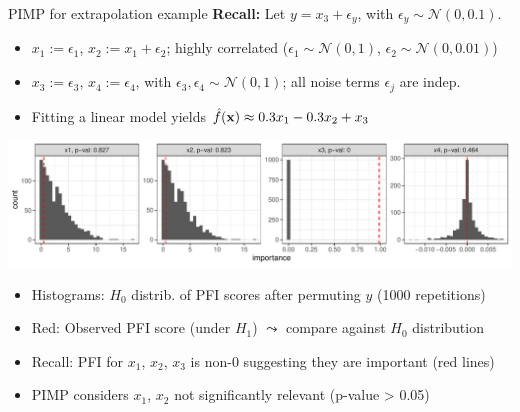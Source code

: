 \documentclass[10pt,compress,t,notes=noshow, xcolor=table]{beamer}
\begin{document}
\begin{frame}{PIMP for extrapolation example}
\textbf{Recall:} 
 Let $y = x_3 + \epsilon_y$, with $\epsilon_y \sim \mathcal{N}(0, 0.1)$.

\begin{itemize}
  \item $x_1 := \epsilon_1$, $x_2 := x_1 + \epsilon_2$; highly correlated  
        ($\epsilon_1 \sim \mathcal{N}(0,1)$, $\epsilon_2 \sim \mathcal{N}(0, 0.01)$)
  \item $x_3 := \epsilon_3$, $x_4 := \epsilon_4$, with $\epsilon_3, \epsilon_4 \sim \mathcal{N}(0,1)$; all noise terms $\epsilon_j$ are indep.
  \item Fitting a linear model yields $\hat{f}(\mathbf{x}) \approx 0.3 x_1 - 0.3 x_2 + x_3$
\end{itemize}

%
  \includegraphics[width=\linewidth]{figure_man/pimp.pdf}

\begin{itemize}
    \item Histograms: $H_0$ distrib. of PFI scores after permuting $y$ (1000 repetitions)
    \item Red: Observed PFI score (under $H_1$) $\leadsto$ compare against $H_0$ distribution
    \item Recall: PFI for $x_1$, $x_2$, $x_3$ is non-0 suggesting they are important (red lines)
    \item PIMP considers $x_1$, $x_2$ not significantly relevant (p-value > 0.05) 

\end{itemize}
\end{frame}
\end{document}
